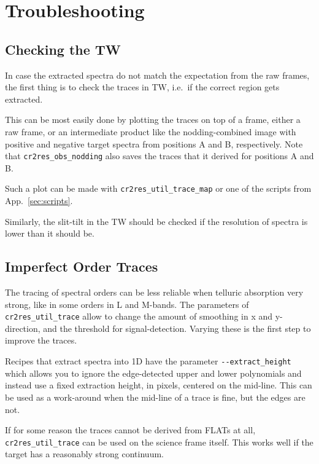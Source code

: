\section{Troubleshooting}
\label{sec:troubleshooting}



\subsection{Checking the TW}

In case the extracted spectra do not match the expectation from the raw frames,
the first thing is to check the traces in TW, i.e.~if the correct region gets
extracted.

This can be most easily done by plotting the traces on top of a
frame, either a raw frame, or an intermediate product like the nodding-combined
image with positive and negative target spectra from positions A and B,
respectively. Note that \texttt{cr2res\_obs\_nodding} also saves the traces that it derived for positions A and B.

Such a plot can be made with \texttt{cr2res\_util\_trace\_map} or one of the
scripts from App.~\ref{sec:scripts}.

Similarly, the slit-tilt in the TW should be checked if the resolution of
spectra is lower than it should be.


\subsection{Imperfect Order Traces}

The tracing of spectral orders can be less reliable when telluric absorption
very strong, like in some orders in L and M-bands. The parameters of
\texttt{cr2res\_util\_trace} allow to change the amount of smoothing in x and
y-direction, and the threshold for signal-detection. Varying these is the first
step to improve the traces.

Recipes that extract spectra into 1D have the parameter
\verb!--extract_height! which allows you to ignore the edge-detected upper
and lower polynomials and instead use a fixed extraction height, in pixels,
centered on the mid-line. This can be used as a work-around when the mid-line of
a trace is fine, but the edges are not.

If for some reason the traces cannot be derived from FLATs at all,
\texttt{cr2res\_util\_trace} can be used on the science frame itself. This works
well if the target has a reasonably strong continuum.

